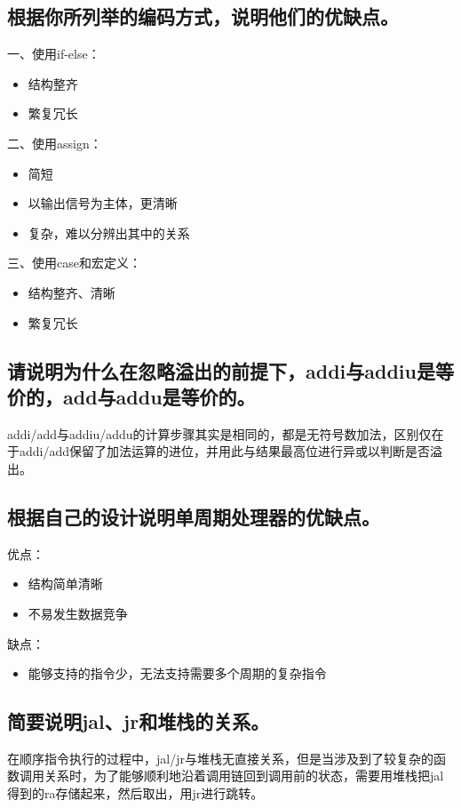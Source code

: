 \documentclass[UTF8]{ctexart}
\begin{document}
\subsection{根据你所列举的编码方式，说明他们的优缺点。}
一、使用if-else：
\begin{itemize}
	\item 结构整齐
	\item 繁复冗长
\end{itemize}
\indent\indent 二、使用assign：
\begin{itemize}
	\item 简短
	\item 以输出信号为主体，更清晰
	\item 复杂，难以分辨出其中的关系
\end{itemize}
\indent\indent 三、使用case和宏定义：
\begin{itemize}
	\item 结构整齐、清晰
	\item 繁复冗长
\end{itemize}
\subsection{请说明为什么在忽略溢出的前提下，addi与addiu是等价的，add与addu是等价的。}
addi/add与addiu/addu的计算步骤其实是相同的，都是无符号数加法，区别仅在于addi/add保留了加法运算的进位，并用此与结果最高位进行异或以判断是否溢出。
\subsection{根据自己的设计说明单周期处理器的优缺点。}
优点：
\begin{itemize}
	\item 结构简单清晰
	\item 不易发生数据竞争
\end{itemize}
\indent\indent 缺点：
\begin{itemize}
	\item 能够支持的指令少，无法支持需要多个周期的复杂指令
\end{itemize}
\subsection{简要说明jal、jr和堆栈的关系。}
在顺序指令执行的过程中，jal/jr与堆栈无直接关系，但是当涉及到了较复杂的函数调用关系时，为了能够顺利地沿着调用链回到调用前的状态，需要用堆栈把jal得到的ra存储起来，然后取出，用jr进行跳转。
\end{document}
